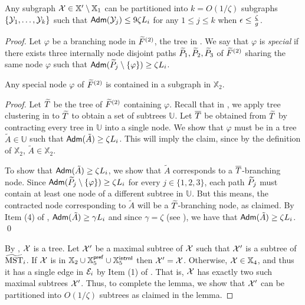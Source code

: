 \begin{lemma}\label{lm:partitionX} Any subgraph $\mathcal{X} \in \mathbb{X}'\setminus \mathbb{X}_1$ can be partitioned into $ k = O(1/\zeta)$ subgraphs $\{\mathcal{Y}_1,\ldots, \mathcal{Y}_k\}$ such that $\mathsf{Adm}(\mathcal{Y}_j)\leq 9 \zeta L_i$ for any $1\leq j\leq k$ when $\epsilon \leq \frac{\zeta}{g}$.
\end{lemma}
\begin{proof}
	Let $\varphi$ be a branching node in $\widetilde{F}^{(2)}$, the tree in . We say that $\varphi$ is \emph{special} if there exists three internally node disjoint paths $\widetilde{P}_1,\widetilde{P}_2,\widetilde{P}_3$ of  $\widetilde{F}^{(2)}$ sharing the same node $\varphi$ such that $\mathsf{Adm}(\widetilde{P}_j \setminus \{\varphi\})\geq \zeta L_i$.
	\begin{claim}\label{clm:special}
		Any special node $\varphi$ of $\widetilde{F}^{(2)}$ is contained in a subgraph  in $\mathbb{X}_2$.
	\end{claim}
	\begin{proof} Let $\widetilde{T}$ be the tree of  $\widetilde{F}^{(2)}$ containing $\varphi$. 	Recall that in , we apply tree clustering in  to $\widetilde{T}$ to obtain a set of subtrees $\mathbb{U}$. Let $\overline{T}$ be obtained from $\widetilde{T}$ by contracting every tree in $\mathbb{U}$ into a single node. We show that $\varphi$ must be in a tree  $\tilde{A} \in \mathbb{U}$ such that $\mathsf{Adm}(\tilde{A})\geq \zeta L_i$. This will imply the claim, since by the definition of $\mathbb{X}_2$,  $\tilde{A}\in \mathbb{X}_2$.
		
		
		To show that $\mathsf{Adm}(\tilde{A})\geq\zeta L_i$, we show that $\tilde{A}$  corresponds to a $\overline{T}$-branching node. Since $\mathsf{Adm}(\widetilde{P}_j \setminus \{\varphi\})\geq \zeta L_i$ for every $j \in \{1,2,3\}$,  each path $\widetilde{P}_j$ must contain at least one node of a different subtree in $\mathbb{U}$. But this means, the contracted node corresponding to $\tilde{A}$ will be a $\widetilde{T}$-branching node, as claimed. By Item (4) of ,  $\mathsf{Adm}(\tilde{A})\geq \gamma L_i$ and since  $\gamma = \zeta$ (see ), we have that $\mathsf{Adm}(\tilde{A})\geq\zeta L_i$. \qed
	\end{proof}
	
	By , $\mathcal{X}$ is a tree. Let $\mathcal{X}'$ be a maximal subtree of $\mathcal{X}$ such that $\mathcal{X}'$ is a subtree of $\widetilde{\mathrm{MST}}_{i}$. If $\mathcal{X}$ is in $\mathbb{X}_2 \cup \mathbb{X}_5^{\mathsf{pref}}\cup \mathbb{X}_5^{\mathsf{intrnl}}$ then $\mathcal{X}' = \mathcal{X}$. Otherwise, $\mathcal{X} \in \mathbb{X}_4$, and thus it has a single edge in $\mathcal{E}_i$ by Item (1) of . That is, $\mathcal{X}$ has exactly two such maximal subtrees $\mathcal{X}'$. Thus, to complete the lemma, we show that $\mathcal{X}'$ can be partitioned into $O(1/\zeta)$ subtrees as claimed in the lemma. 
	

\end{proof}
